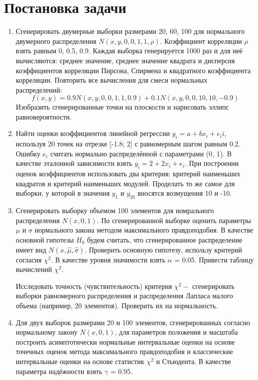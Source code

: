 

\section{Постановка задачи}

\begin{enumerate}
	\item Сгенерировать двумерные выборки размерами 20, 60, 100 для нормального двумерного распределения $N(x, y, 0, 0, 1, 1, \rho)$. Коэффициент корреляции $\rho$ взять равным 0, 0.5,
	0.9. Каждая выборка генерируется 1000 раз и для неё вычисляются: среднее значение,
	среднее значение квадрата и дисперсия коэффициентов корреляции Пирсона, Спирмена и квадратного коэффициента корреляции. Повторить все вычисления для смеси
	нормальных распределений:
	\begin{equation}
		f(x,y) = 0.9 N(x,y,0,0,1,1,0.9) + 0.1N(x,y,0,0,10,10,-0.9)
	\end{equation}
    Изобразить сгенерированные точки на плоскости и нарисовать эллипс равновероятности.
    \item Найти оценки коэффициентов линейной регрессии $y_i = a + bx_i + e_ii$, используя 20 точек
    на отрезке [-1.8; 2] с равномерным шагом равным 0.2. Ошибку $e_i$ считать нормально
    распределённой с параметрами (0, 1). В качестве эталонной зависимости взять $y_i =
    2+2x_i+e_i$. При построении оценок коэффициентов использовать два критерия: критерий
    наименьших квадратов и критерий наименьших модулей. Проделать то же самое для
    выборки, у которой в значения $y_1$ и $y_{20}$ вносятся возмущения 10 и -10.
    \item Сгенерировать выборку объемом 100 элементов для номрального распределения $N(x,0,1)$. По сгенерированной выборке оценить параметры $\mu$ и $\sigma$ нормального закона методом максимального правдоподобия. В качестве основной гипотезы $H_0$ будем считать, что сгенерированное распределение имеет вид $N(x,\hat{\mu}, \hat{\sigma})$. Проверить основную гипотезу, использу критерий согласия $\chi^{2}$. В качестве уровня значимости взять $\alpha$ = 0.05. Привести таблицу вычислений $\chi^{2}$. 
    
    Исследовать точность (чувствительность) критерия $\chi^{2} - $ сгенерировать выборки равномерного распределения и распределения Лапласа малого объема (например, 20 элементов). Проверить их на нормальность.
    \item  Для двух выборок размерами 20 и 100 элементов, сгенерированных согласно нормальному закону $N(x,0,1)$, для параметров положения и масштаба построить асимптотически нормальные интервальные оценки на основе точечных оценок метода максимального правдоподобия и классические интервальные оценки на основе статистик $\chi^{2}$ и Стьюдента. В качестве параметра надёжности взять $\gamma$ = 0.95.
\end{enumerate}
